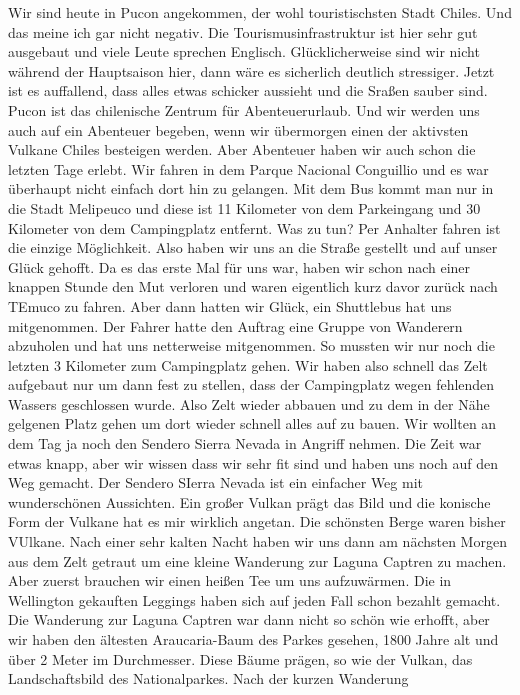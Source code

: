 \documentclass[11pt]{book}
\begin{document}
Wir sind heute in Pucon angekommen, der wohl touristischsten Stadt Chiles. Und das meine ich gar nicht negativ. Die Tourismusinfrastruktur 
ist hier sehr gut ausgebaut und viele Leute sprechen Englisch. Glücklicherweise sind wir nicht während der Hauptsaison hier, dann 
wäre es sicherlich deutlich stressiger. Jetzt ist es auffallend, dass alles etwas schicker aussieht und die Sraßen sauber sind. 
Pucon ist das chilenische Zentrum für Abenteuerurlaub. Und wir werden uns auch auf ein Abenteuer begeben, wenn wir übermorgen 
einen der aktivsten Vulkane Chiles besteigen werden. Aber Abenteuer haben wir auch schon die letzten Tage erlebt. Wir fahren in dem 
Parque Nacional Conguillio und es war überhaupt nicht einfach dort hin zu gelangen. Mit dem Bus kommt man nur in die Stadt Melipeuco und 
diese ist 11 Kilometer von dem Parkeingang und 30 Kilometer von dem Campingplatz entfernt. Was zu tun? Per Anhalter fahren ist die 
einzige Möglichkeit. Also haben wir uns an die Straße gestellt und auf unser Glück gehofft. Da es das erste Mal für uns war, haben
wir schon nach einer knappen Stunde den Mut verloren und waren eigentlich kurz davor zurück nach TEmuco zu fahren. Aber dann hatten wir 
Glück, ein Shuttlebus hat uns mitgenommen. Der Fahrer hatte den Auftrag eine Gruppe von Wanderern abzuholen und hat uns netterweise 
mitgenommen. So mussten wir nur noch die letzten 3 Kilometer zum Campingplatz gehen. Wir haben also schnell das Zelt aufgebaut nur 
um dann fest zu stellen, dass der Campingplatz wegen fehlenden Wassers geschlossen wurde. Also Zelt wieder abbauen und zu dem in der
Nähe gelgenen Platz gehen um dort wieder schnell alles auf zu bauen. Wir wollten an dem Tag ja noch den Sendero Sierra Nevada in 
Angriff nehmen. Die Zeit war etwas knapp, aber wir wissen dass wir sehr fit sind und haben uns noch auf den Weg gemacht. Der Sendero 
SIerra Nevada ist ein einfacher Weg mit wunderschönen Aussichten. Ein großer Vulkan prägt das Bild und die konische Form der Vulkane 
hat es mir wirklich angetan. Die schönsten Berge waren bisher VUlkane. Nach einer sehr kalten Nacht haben wir uns dann am nächsten 
Morgen aus dem Zelt getraut um eine kleine Wanderung zur Laguna Captren zu machen. Aber zuerst brauchen wir einen heißen Tee um uns 
aufzuwärmen. Die in Wellington gekauften Leggings haben sich auf jeden Fall schon bezahlt gemacht. Die Wanderung zur Laguna Captren 
war dann nicht so schön wie erhofft, aber wir haben den ältesten Araucaria-Baum des Parkes gesehen, 1800 Jahre alt und über 2 
Meter im Durchmesser. Diese Bäume prägen, so wie der Vulkan, das Landschaftsbild des Nationalparkes. Nach der kurzen Wanderung 
\end{document}
